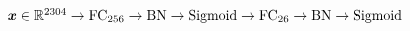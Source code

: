 $\vect{x} \in \real^{2304}
	\newline \rightarrow \text{FC}_{256} \rightarrow \text{BN} \rightarrow \text{Sigmoid}
	\newline \rightarrow \text{FC}_{26} \rightarrow \text{BN} \rightarrow \text{Sigmoid}$